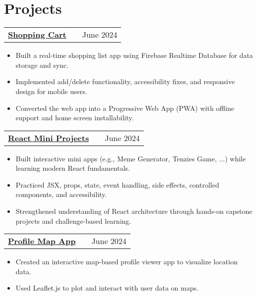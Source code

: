 \documentclass[a4paper,10pt]{article}
\makeatletter
\newenvironment{joblong}[2]
    {
    \begin{tabularx}{\linewidth}{@{}l X r@{}}
    \textbf{#1} & \hfill &  #2 \\[3.75pt]
    \end{tabularx}
    \begin{minipage}[t]{\linewidth}
    \begin{itemize}[nosep,after=\strut, leftmargin=1em, itemsep=3pt,label=--]
    }
    {
    \end{itemize}
    \end{minipage}    
    }
\makeatother
\begin{document}
\section{Projects}


    \begin{joblong}
        {\href{https://github.com/gauravgorane/Shopping_cart}{Shopping Cart \faExternalLink*} \normalfont{\textit{[JavaScript, Tailwind CSS, Firebase, PWA]}}}{June 2024}
        \item Built a real-time shopping list app using Firebase Realtime Database for data storage and sync. 
        \item Implemented add/delete functionality, accessibility fixes, and responsive design for mobile users.
        \item Converted the web app into a Progressive Web App (PWA) with offline support and home screen installability.
    \end{joblong}

    \begin{joblong}
        {\href{https://github.com/gauravgorane/React_mini_projects}{React Mini Projects \faExternalLink*} \normalfont{\textit{[React, React Hooks, Components]}}}{June 2024}
        \item Built interactive mini apps (e.g., Meme Generator, Tenzies Game, ...) while learning modern React fundamentals.
        \item Practiced JSX, props, state, event handling, side effects, controlled components, and accessibility.
        \item Strengthened understanding of React architecture through hands-on capstone projects and challenge-based learning.
    \end{joblong}

    \begin{joblong}
        {\href{https://github.com/gauravgorane/profile-map-app}{Profile Map App \faExternalLink*} \normalfont{\textit{[React, React Router, Leaflet, Tailwind CSS]}}}{June 2024}
        \item Created an interactive map-based profile viewer app to visualize location data.
        \item Used Leaflet.js to plot and interact with user data on maps.
    \end{joblong}
\end{document}
